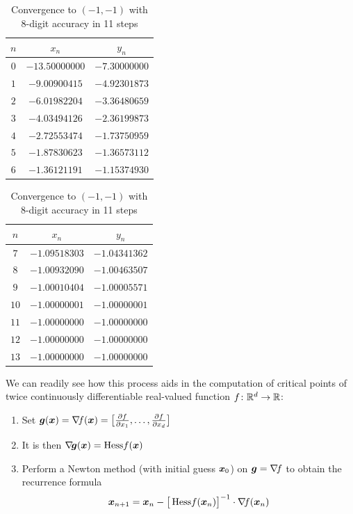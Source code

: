 \begin{example}
\begin{enumerate}
\begin{table}[ht!]
\begin{tabular}{|c|c|c|}
	$n$ & $x_n$ & $y_n$ \\ \hline \hline 
	$0$ & $-13.50000000$ & $-7.30000000$ \\ \hline 
	$1$ & $-9.00900415$ & $-4.92301873$ \\ \hline 
	$2$ & $-6.01982204$ & $-3.36480659$ \\ \hline 
	$3$ & $-4.03494126$ & $-2.36199873$ \\ \hline 
	$4$ & $-2.72553474$ & $-1.73750959$ \\ \hline 
	$5$ & $-1.87830623$ & $-1.36573112$ \\ \hline 
	$6$ & $-1.36121191$ & $-1.15374930$ \\ \hline 
	\end{tabular}
	\begin{tabular}{|c|c|c|} \hline 
	$n$ & $x_n$ & $y_n$ \\ \hline \hline 
	$7$ & $-1.09518303$ & $-1.04341362$ \\ \hline 
	$8$ & $-1.00932090$ & $-1.00463507$ \\ \hline 
	$9$ & $-1.00010404$ & $-1.00005571$ \\ \hline 
	$10$ & $-1.00000001$ & $-1.00000001$ \\ \hline 
	$11$ & $-1.00000000$ & $-1.00000000$ \\ \hline 
	$12$ & $-1.00000000$ & $-1.00000000$ \\ \hline 
	$13$ & $-1.00000000$ & $-1.00000000$ \\ \hline 
	\end{tabular}
	\caption{Convergence to $(-1,-1)$ with 8-digit accuracy in 11 steps}
	\label{table:-1-1}
	\end{table}
\end{enumerate}
\end{example}

We can readily see how this process aids in the computation of critical points of twice continuously differentiable real-valued function $f\colon \mathbb{R}^d \to \mathbb{R}$:
\begin{enumerate}
	\item Set $\boldsymbol{g}(\boldsymbol{x}) = \mathop{\nabla\! {f}}(\boldsymbol{x}) = \big[ \frac{\partial f}{\partial x_1}, \dotsc, \frac{\partial f}{\partial x_d} \big]$
	\item It is then $\mathop{\nabla\! {\boldsymbol{g}}}(\boldsymbol{x}) = \mathop{\mathrm{Hess}{f}}(\boldsymbol{x})$
	\item Perform a Newton method (with initial guess $\boldsymbol{x}_0$) on $\boldsymbol{g}=\mathop{\nabla\! {f}}$ to obtain the recurrence formula
	\begin{equation}\label{equation:Newton4Crit}
	\boldsymbol{x}_{n+1} = \boldsymbol{x}_n - \big[ \mathop{\mathrm{Hess}{f}}(\boldsymbol{x}_n) \big]^{-1} \cdot \mathop{\nabla\! {f}}(\boldsymbol{x}_n)
	\end{equation}
\end{enumerate}

